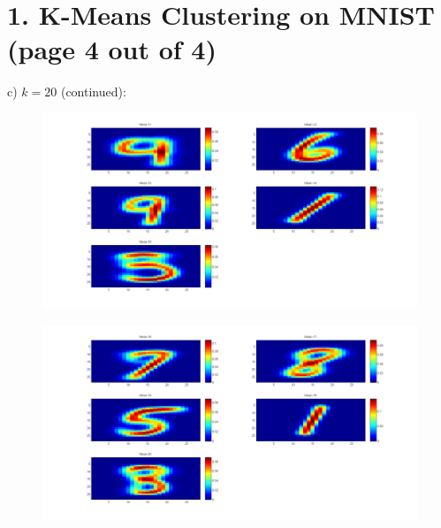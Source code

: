 \documentclass[11pt]{article}
\begin{document}
\section*{1. K-Means Clustering on MNIST (page 4 out of 4)}
c) $k=20$ (continued):
\begin{figure}[ht!]
\centering
\includegraphics[width=180mm]{images/mean20-3.png}
\label{overflow}
\end{figure}
\begin{figure}[ht!]
\centering
\includegraphics[width=180mm]{images/mean20-4.png}
\label{overflow}
\end{figure}
\newpage
\end{document}
